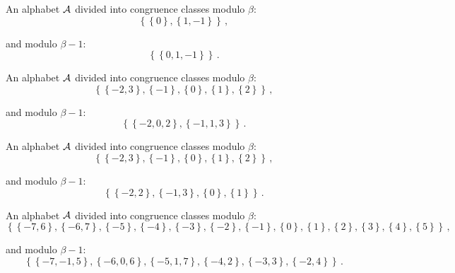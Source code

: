 \begin{exmp}
\label{ex:integerAH}

An alphabet $\mathcal{A}$ divided into congruence classes modulo $\beta$: 
$$ \left\{\left\{0\right\}, \left\{1, -1\right\}\right\} \,,$$

and modulo $\beta - 1$: $$ \left\{\left\{0, 1, -1\right\}\right\} \,.$$

\end{exmp}




\begin{exmp}
\label{ex:integerAJ}

An alphabet $\mathcal{A}$ divided into congruence classes modulo $\beta$: 
$$ \left\{\left\{-2, 3\right\}, \left\{-1\right\}, \left\{0\right\}, \left\{1\right\}, \left\{2\right\}\right\} \,,$$

and modulo $\beta - 1$: $$ \left\{\left\{-2, 0, 2\right\}, \left\{-1, 1, 3\right\}\right\} \,.$$

\end{exmp}


\begin{exmp}
\label{ex:integerAK}

An alphabet $\mathcal{A}$ divided into congruence classes modulo $\beta$: 
$$ \left\{\left\{-2, 3\right\}, \left\{-1\right\}, \left\{0\right\}, \left\{1\right\}, \left\{2\right\}\right\} \,,$$

and modulo $\beta - 1$: $$ \left\{\left\{-2, 2\right\}, \left\{-1, 3\right\}, \left\{0\right\}, \left\{1\right\}\right\} \,.$$

\end{exmp}



\begin{exmp}
\label{ex:integerAO}

An alphabet $\mathcal{A}$ divided into congruence classes modulo $\beta$: 
$$ \left\{\left\{-7, 6\right\}, \left\{-6, 7\right\}, \left\{-5\right\}, \left\{-4\right\}, \left\{-3\right\}, \left\{-2\right\}, \left\{-1\right\}, \left\{0\right\}, \left\{1\right\}, \left\{2\right\}, \left\{3\right\}, \left\{4\right\}, \left\{5\right\}\right\} \,,$$

and modulo $\beta - 1$: $$ \left\{\left\{-7, -1, 5\right\}, \left\{-6, 0, 6\right\}, \left\{-5, 1, 7\right\}, \left\{-4, 2\right\}, \left\{-3, 3\right\}, \left\{-2, 4\right\}\right\} \,.$$

\end{exmp}



